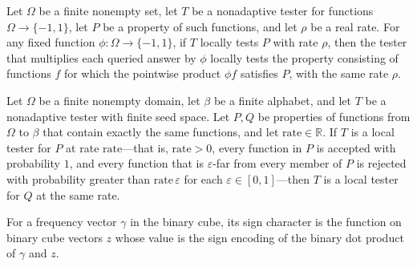 \begin{theorem}
\label{FABL.isLocalTester_signTwist}
\leanok
{}
Let $\Omega$ be a finite nonempty set, let $T$ be a nonadaptive tester for functions
$\Omega\to\{-1,1\}$, let $P$ be a property of such functions, and let $\rho$ be a real
rate. For any fixed function $\phi:\Omega\to\{-1,1\}$, if $T$ locally tests $P$ with
rate $\rho$, then the tester that multiplies each queried answer by $\phi$ locally tests
the property consisting of functions $f$ for which the pointwise product $\phi f$
satisfies $P$, with the same rate $\rho$.
\end{theorem}

\begin{theorem}
\label{FABL.IsLocalTester.congr_property}
\leanok
{}
Let $\Omega$ be a finite nonempty domain, let $\beta$ be a finite alphabet, and let $T$
be a nonadaptive tester with finite seed space. Let $P,Q$ be properties of functions
from $\Omega$ to $\beta$ that contain exactly the same functions, and let
$\mathrm{rate}\in\mathbb R$. If $T$ is a local tester for $P$ at rate
$\mathrm{rate}$—that is, $\mathrm{rate}>0$, every function in $P$ is accepted with
probability $1$, and every function that is $\varepsilon$-far from every member of $P$
is rejected with probability greater than $\mathrm{rate}\,\varepsilon$ for each
$\varepsilon\in[0,1]$—then $T$ is a local tester for $Q$ at the same rate.
\end{theorem}

\begin{definition}
\leanok
{}
For a frequency vector $\gamma$ in the binary cube, its sign character is the function
on binary cube vectors $z$ whose value is the sign encoding of the binary dot product of
$\gamma$ and $z$.
\end{definition}

